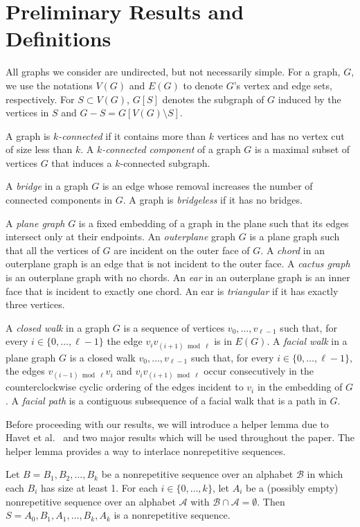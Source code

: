\documentclass{patmorin}
\begin{document}
\section{Preliminary Results and Definitions}

All graphs we consider are undirected, but not necessarily simple.  For a
graph, $G$, we use the notations $V(G)$ and $E(G)$ to denote $G$'s vertex
and edge sets, respectively. For $S\subset V(G)$, $G[S]$ denotes the
subgraph of $G$ induced by the vertices in $S$ and $G-S=G[V(G)\setminus
S]$.

A graph is \emph{$k$-connected} if it contains more than $k$ vertices
and has no vertex cut of size less than $k$.  A \emph{$k$-connected
component} of a graph $G$ is a maximal subset of vertices $G$ that
induces a $k$-connected subgraph.

A \emph{bridge} in a graph $G$ is an edge whose removal increases the
number of connected components in $G$.  A graph is \emph{bridgeless}
if it has no bridges.

A \emph{plane graph} $G$ is a fixed embedding of a graph in the plane such
that its edges intersect only at their endpoints. An \emph{outerplane}
graph $G$ is a plane graph such that all the vertices of $G$ are incident
on the outer face of $G$. A \emph{chord} in an outerplane graph is
an edge that is not incident to the outer face. A \emph{cactus graph}
is an outerplane graph with no chords.  An \emph{ear} in an outerplane
graph is an inner face that is incident to exactly one chord. An ear is
\emph{triangular} if it has exactly three vertices.

A \emph{closed walk} in a graph $G$ is a sequence of vertices
$v_0,\ldots,v_{\ell-1}$ such that, for every $i\in\{0,\ldots,\ell-1\}$
the edge $v_iv_{(i+1)\bmod \ell}$ is in $E(G)$.
A \emph{facial walk} in a plane graph $G$ is a closed walk
$v_0,\ldots,v_{\ell-1}$ such that, for every $i\in\{0,\ldots,\ell-1\}$,
the edges $v_{(i-1)\bmod \ell} v_i$ and $v_iv_{(i+1)\bmod\ell}$ occur
consecutively in the counterclockwise cyclic ordering of the edges
incident to $v_i$ in the embedding of $G$.  A \emph{facial path} is a
contiguous subsequence of a facial walk that is a path in $G$.

Before proceeding with our results, we will introduce a helper lemma
due to Havet et al.~\cite{havet2011facial} and two major results which
will be used throughout the paper. The helper lemma provides a way to
interlace nonrepetitive sequences.

\begin{lem}
  Let $B=B_1,B_2,\ldots,B_k$ be a nonrepetitive sequence over an alphabet
  $\mathcal{B}$ in which each $B_i$ has size at least 1. For each $i
  \in \{0,\ldots,k\}$, let $A_i$ be a (possibly empty) nonrepetitive
  sequence over an alphabet $\mathcal{A}$ with $\mathcal{B} \cap
  \mathcal{A} = \emptyset$. Then $S = A_0, B_1, A_1, \ldots, B_k, A_k$
  is a nonrepetitive sequence.
\end{lem}
\end{document}
